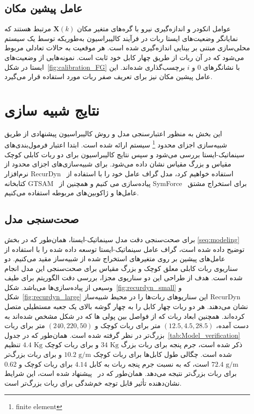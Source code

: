 \subsection{عامل پیشین مکان}
عوامل انکودر و اندازه‌گیری نیرو با گره‌های متغیر مکان $\bm{X}(k)$ مرتبط هستند که نمایانگر وضعیت‌های ایستا ربات در فرآیند کالیبراسیون به‌طوریکه توسط یک سیستم محلی‌سازی مبتنی بر بینایی اندازه‌گیری شده است. 
هر موقعیت به حالات تعادلی مربوط می‌شود که در آن ربات از طریق چهار کابل خود ثابت است. نمونه‌هایی از وضعیت‌های ایستا در شکل~\ref{fig:calibration_FG} با نشانگرهای $0$ و $i$ برچسب‌گذاری شده‌اند. این عامل پیشین  مکان نیز برای تعریف صفر ربات مورد استفاده قرار می‌گیرد.



\section{نتایج شبیه سازی} \label{sec:results}
این بخش به منظور اعتبارسنجی مدل و روش کالیبراسیون پیشنهادی از طریق شبیه‌سازی اجزای محدود
\footnote{finite element}
 سیستم ارائه شده است. ابتدا اعتبار فرمول‌بندی‌های سینماتیک-ایستا بررسی می‌شود و سپس نتایج کالیبراسیون برای دو ربات کابلی کوچک مقیاس و بزرگ مقیاس نشان داده می‌شود. برای شبیه‌سازی‌های اجزای محدود از نرم‌افزار RecurDyn~\cite{functionbay} استفاده خواهیم کرد، مدل گراف عامل خود را با استفاده از کتابخانه GTSAM~\cite{dellaert2012factor} پیاده‌سازی می کنیم و همچنین از SymForce~\cite{Martiros-RSS-22} برای استخراج مشتق عامل‌ها و ژاکوبین‌های مربوطه استفاده می‌کنیم.


\subsection{صحت‌سنجی مدل}
برای صحت‌سنجی دقت مدل سینماتیک-ایستا، همان‌طور که در بخش 
\ref{seq:modeling}
توضیح داده شده است، گراف عامل سینماتیک-ایستا توسعه داده شده را با استفاده از عامل‌های پیشین بر روی متغیرهای استخراج شده از شبیه‌ساز مقید می‌کنیم. دو سناریوی ربات کابلی معلق کوچک و بزرگ مقیاس برای صحت‌سنجی این مدل انجام شده است. هدف از طراحی این دو سناریوی مجزا، بررسی دقت الگوریتم برای طیف وسیعی از پیاده‌سازی‌ها می‌باشد. شکل~\ref{fig:recurdyn_small} و شکل~\ref{fig:recurdyn_large} این سناریوهای ربات‌ها را در محیط شبیه‌ساز RecurDyn نشان می‌دهند. هر دو ربات چهار کابل را به چهار گوشه بالای یک جعبه مستطیلی  متصل کرده‌اند. همچنین ابعاد ربات که از فواصل بین پولی ها که در شکل مشخص شده‌اند به دست آمده، $(12.5, 4.5, 28.5)$ متر برای ربات کوچک و $(240, 220, 50)$ متر برای ربات بزرگ‌تر در نظر گرفته شده است. همان‌طور که در جدول~\ref{tab:Model_verification} ذکر شده است، جرم پنجه برای ربات بزرگ $34 \text{ Kg}$ و برای ربات کوچک $4.4 \text{ Kg}$ تنظیم شده است. چگالی طول کابل‌ها برای ربات کوچک $10.2 \text{ g/m}$ و برای ربات بزرگ‌تر $72.4 \text{ g/m}$ است، که به نسبت جرم پنجه ربات به کابل $4.14$ برای ربات کوچک و $0.62$ برای ربات بزرگ‌تر نتیجه می‌دهد. همان‌طور که در~\cite{pott2013cable} پیشنهاد شده است، این شرایط نشان‌دهنده تأثیر قابل توجه خم‌شدگی برای ربات بزرگ‌تر است.

